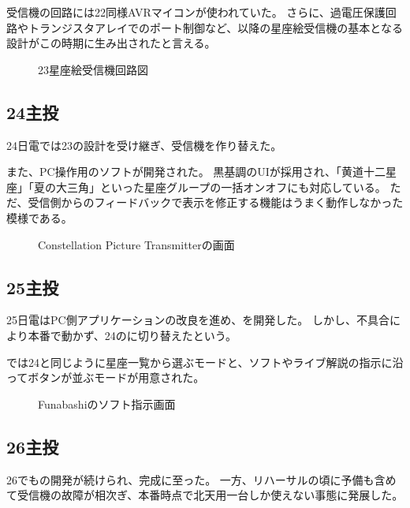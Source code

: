 \documentclass[letterpaper,10pt,dvipdfmx]{sphinxmanual}
\begin{document}
受信機の回路には22同様AVRマイコンが使われていた。
さらに、過電圧保護回路やトランジスタアレイでのポート制御など、以降の星座絵受信機の基本となる設計がこの時期に生み出されたと言える。
\begin{figure}[htbp]
\centering
\capstart

\noindent{}
\caption{23星座絵受信機回路図}\label{\detokenize{wireless/wireless:id18}}\end{figure}


\subsection{24主投}
\label{\detokenize{wireless/wireless:id7}}
24日電では23の設計を受け継ぎ、受信機を作り替えた。

また、PC操作用のソフトが開発された。
黒基調のUIが採用され、「黄道十二星座」「夏の大三角」といった星座グループの一括オンオフにも対応している。
ただ、受信側からのフィードバックで表示を修正する機能はうまく動作しなかった模様である。
\begin{figure}[htbp]
\centering
\capstart

\noindent{}
\caption{Constellation Picture Transmitterの画面}\label{\detokenize{wireless/wireless:id19}}\end{figure}


\subsection{25主投}
\label{\detokenize{wireless/wireless:id8}}
25日電はPC側アプリケーションの改良を進め、を開発した。
しかし、不具合により本番で動かず、24のに切り替えたという。

では24と同じように星座一覧から選ぶモードと、ソフトやライブ解説の指示に沿ってボタンが並ぶモードが用意された。
\begin{figure}[htbp]
\centering
\capstart

\noindent{}
\caption{Funabashiのソフト指示画面}\label{\detokenize{wireless/wireless:id20}}\end{figure}


\subsection{26主投}
\label{\detokenize{wireless/wireless:id9}}
26でもの開発が続けられ、完成に至った。
一方、リハーサルの頃に予備も含めて受信機の故障が相次ぎ、本番時点で北天用一台しか使えない事態に発展した。
\end{document}
